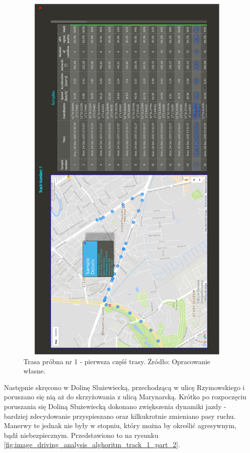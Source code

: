 \begin{figure}[H]
	\centering
	\includegraphics[height=19cm, width=13cm]{img/driving_analysis/test_track_1_lagodna.png}
	\caption{Trasa próbna nr 1 - pierwsza częśś trasy. Źródło: Opracowanie własne.}
	\label{fig:image_driving_analysis_alghoritm_track_1_part_1}
\end{figure}

Następnie skręcono w Dolinę Slużewiecką, przechodzącą w ulicę Rzymowskiego i poruszano się nią aż do skrzyżowania z ulicą Marynarską. Krótko po rozpoczęciu poruszania się Doliną Służewiecką dokonano zwiększenia dynamiki jazdy - bardziej zdecydowanie przyspieszano oraz kilkukrotnie zmieniano pasy ruchu. Manerwy te jednak nie były w stopniu, który można by określić agresywnym, bądź niebezpiecznym. Przedstawiono to na rysunku \ref{fig:image_driving_analysis_alghoritm_track_1_part_2}.

